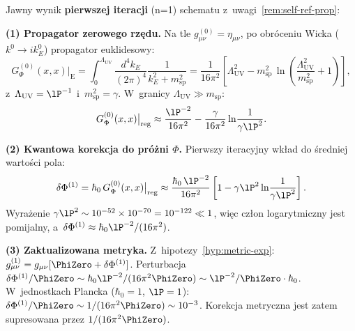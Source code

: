 \begin{proposition}%
\label{prop:first-iteration}
Jawny wynik \textbf{pierwszej iteracji} (n=1) schematu
z~uwagi~\ref{rem:self-ref-prop}:

\medskip
\noindent\textbf{(1) Propagator zerowego rzędu.}
Na tle $g_{\mu\nu}^{(0)} = \eta_{\mu\nu}$, po obróceniu Wicka
($k^0 \to ik_E^0$) propagator euklidesowy:
\begin{equation}\label{eq:prop-eucl}
    G_\Phi^{(0)}(x,x)\big|_{\mathrm{E}}
    = \int_0^{\Lambda_{\mathrm{UV}}} \frac{d^4k_E}{(2\pi)^4}
      \frac{1}{k_E^2 + m_{\mathrm{sp}}^2}
    = \frac{1}{16\pi^2}
      \left[\Lambda_{\mathrm{UV}}^2 - m_{\mathrm{sp}}^2\,
      \ln\!\left(\frac{\Lambda_{\mathrm{UV}}^2}{m_{\mathrm{sp}}^2} + 1\right)\right],
\end{equation}
z~$\Lambda_{\mathrm{UV}} = \lP^{-1}$ i~$m_{\mathrm{sp}}^2 = \gamma$.
W~granicy $\Lambda_{\mathrm{UV}} \gg m_{\mathrm{sp}}$:
\begin{equation}\label{eq:prop-approx}
    G_\Phi^{(0)}(x,x)\big|_{\mathrm{reg}}
    \approx \frac{\lP^{-2}}{16\pi^2}
    - \frac{\gamma}{16\pi^2}\ln\!\frac{1}{\gamma\lP^2}.
\end{equation}

\noindent\textbf{(2) Kwantowa korekcja do próżni $\Phi$.}
Pierwszy iteracyjny wkład do średniej wartości pola:
\begin{equation}\label{eq:Phi-1st-corr}
    \delta\Phi^{(1)} = \hbar_0\,G_\Phi^{(0)}(x,x)\big|_{\mathrm{reg}}
    \approx \frac{\hbar_0\,\lP^{-2}}{16\pi^2}
    \left[1 - \gamma\lP^2\ln\!\frac{1}{\gamma\lP^2}\right].
\end{equation}
Wyrażenie $\gamma\lP^2 \sim 10^{-52}\times 10^{-70} = 10^{-122} \ll 1$,
więc człon logarytmiczny jest pomijalny, a~$\delta\Phi^{(1)}
\approx \hbar_0\lP^{-2}/(16\pi^2)$.

\noindent\textbf{(3) Zaktualizowana metryka.}
Z~hipotezy~\ref{hyp:metric-exp}: $g_{\mu\nu}^{(1)} =
g_{\mu\nu}[\PhiZero + \delta\Phi^{(1)}]$.
Perturbacja $\delta\Phi^{(1)}/\PhiZero \sim \hbar_0 \lP^{-2}/(16\pi^2\PhiZero)
\sim \lP^{-2}/\PhiZero \cdot \hbar_0$.
W~jednostkach Plancka ($\hbar_0 = 1$, $\lP = 1$):
$\delta\Phi^{(1)}/\PhiZero \sim 1/(16\pi^2\PhiZero) \sim 10^{-3}$.
Korekcja metryczna jest zatem supresowana przez $1/(16\pi^2\PhiZero)$.


\end{proposition}

